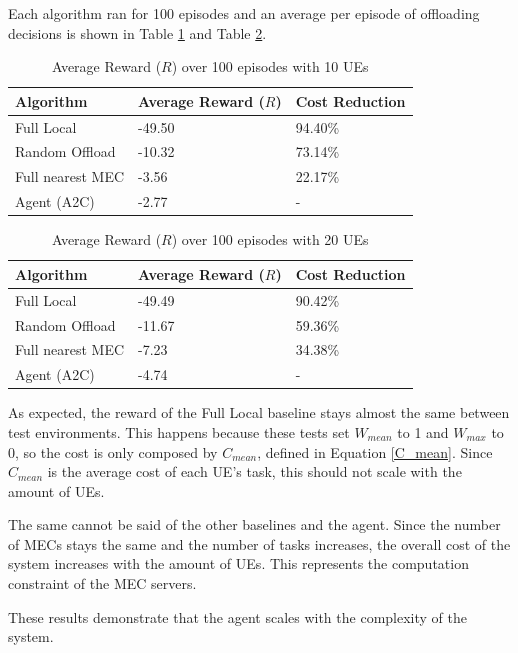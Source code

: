 \hfill \break
Each algorithm ran for 100 episodes and an average per episode of offloading decisions is shown in Table \ref{results_5_10} and Table \ref{results_5_20}.

\begin{table}[H]
\centering
\begin{tabular}{|l|l|l|}
\hline
Algorithm        & Average Reward ($R$) & Cost Reduction\\ \hline
Full Local       & -49.50 & 94.40\%\\
Random Offload   & -10.32 & 73.14\%\\
Full nearest MEC & -3.56 & 22.17\%\\ 
Agent (A2C) & -2.77 & -\\ \hline
\end{tabular}
\caption{Average Reward ($R$) over 100 episodes with 10 \acrshort{UE}s} \label{results_5_10}
\end{table}

\begin{table}[H]
\centering
\begin{tabular}{|l|l|l|}
\hline
Algorithm        & Average Reward ($R$) & Cost Reduction\\ \hline
Full Local       & -49.49 & 90.42\%\\
Random Offload   & -11.67 & 59.36\%\\
Full nearest MEC & -7.23 & 34.38\%\\ 
Agent (A2C) & -4.74 & -\\ \hline
\end{tabular}
\caption{Average Reward ($R$) over 100 episodes with 20 \acrshort{UE}s} \label{results_5_20}
\end{table}

As expected, the reward of the Full Local baseline stays almost the same between test environments. This happens because these tests set $W_{mean}$ to 1 and $W_{max}$ to 0, so the cost is only composed by $C_{mean}$, defined in Equation \ref{C_mean}. Since $C_{mean}$ is the average cost of each \acrshort{UE}'s task, this should not scale with the amount of \acrshort{UE}s.

The same cannot be said of the other baselines and the agent. Since the number of \acrshort{MEC}s stays the same and the number of tasks increases, the overall cost of the system increases with the amount of \acrshort{UE}s. This represents the computation constraint of the \acrshort{MEC} servers. 

These results demonstrate that the agent scales with the complexity of the system.

